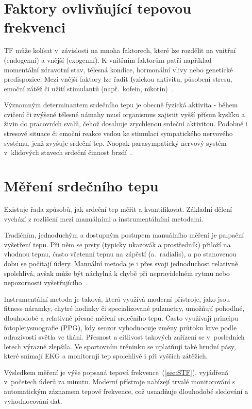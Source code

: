 \section{Faktory ovlivňující tepovou frekvenci}

\acs{TF} může kolísat v~závislosti na mnoha faktorech, které lze rozdělit na vnitřní (endogenní) a vnější (exogenní).
K vnitřním faktorům patří například momentální zdravotní stav, tělesná kondice, hormonální vlivy nebo genetické predispozice.
Mezi vnější faktory lze řadit fyzickou aktivitu, působení stresu, emoční zátěž či užití stimulantů (např.~kofein, nikotin)~\cite{faktoryOvlivnujiciTep}.

Významným determinantem srdečního tepu je obecně fyzická aktivita - během cvičení či zvýšené tělesné námahy musí organismus zajistit vyšší přísun kyslíku a živin do pracovních svalů, čehož dosahuje zrychlenou srdeční aktivitou.
Podobně i stresové situace či emoční reakce vedou ke stimulaci sympatického nervového systému, jenž zvyšuje srdeční tep.
Naopak parasympatický nervový systém v~klidových stavech srdeční činnost brzdí~\cite{faktoryOvlivnujiciTep}.

\section{Měření srdečního tepu}

Existuje řada způsobů, jak srdeční tep měřit a kvantifikovat.
Základní dělení vychází z rozlišení mezi manuálními a instrumentálními metodami.

Tradičním, jednoduchým a dostupným postupem manuálního měření je palpační vyšetření tepu.
Při něm se prsty (typicky ukazovák a prostředník) přiloží na vhodnou tepnu, často vřetenní tepnu na zápěstí (a.~radialis), a po stanovenou dobu se počítají údery.
Manuální metoda je i přes svoji jednoduchost relativně spolehlivá, avšak může být náchylná k chybě při nepravidelném rytmu nebo nepozornosti vyšetřujícího~\cite{vnitrniLekarstviVKostce}.

Instrumentální metoda je taková, která využívá moderní přístroje, jako jsou fitness náramky, chytré hodinky či specializované pulzmetry, umožňují pohodlné, dlouhodobé a relativně přesné měření srdečního tepu.
Často využívají principu fotopletysmografie (PPG), kdy senzor vyhodnocuje změny průtoku krve podle odrazivosti světla ve tkáni.
Přesnost a citlivost takových zařízení se v~posledních letech výrazně zlepšila.
Ve sportovním tréninku se uplatňují také hrudní pásy, které snímají EKG a monitorují tep spolehlivě i při vyšších zátěžích.

Výsledkem měření je výše popsaná tepová frekvence~(\ref{sec:STF}), vyjádřená v~početech úderů za minutu.
Moderní přístroje nabízejí trvalé monitorování s automatickým záznamem tepové frekvence, což usnadňuje dlouhodobé sledování a vyhodnocování dat.
